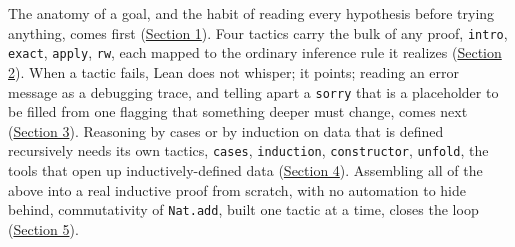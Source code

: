 The anatomy of a goal, and the habit of reading every hypothesis before trying anything, comes first (\hyperref[sec:05-tactics:01-goal-state:1]{Section 1}). Four tactics carry the bulk of any proof, \texttt{intro}, \texttt{exact}, \texttt{apply}, \texttt{rw}, each mapped to the ordinary inference rule it realizes (\hyperref[sec:05-tactics:02-core-tactics:1]{Section 2}). When a tactic fails, Lean does not whisper; it points; reading an error message as a debugging trace, and telling apart a \texttt{sorry} that is a placeholder to be filled from one flagging that something deeper must change, comes next (\hyperref[sec:05-tactics:03-reading-failures:1]{Section 3}). Reasoning by cases or by induction on data that is defined recursively needs its own tactics, \texttt{cases}, \texttt{induction}, \texttt{constructor}, \texttt{unfold}, the tools that open up inductively-defined data (\hyperref[sec:05-tactics:04-more-tactics:1]{Section 4}). Assembling all of the above into a real inductive proof from scratch, with no automation to hide behind, commutativity of \texttt{Nat.add}, built one tactic at a time, closes the loop (\hyperref[sec:05-tactics:05-worked-example:1]{Section 5}).








